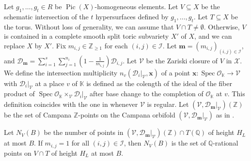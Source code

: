 \documentclass[10pt, a4paper, reqno, english]{amsart}
\newcommand\ZZ{\mathbb{Z}}
\newcommand\QQ{\mathbb{Q}}
\newcommand{\KK}{\mathbb{K}} %
\newcommand{\OO}{\mathcal{O}} %
\newcommand{\indexset}{{\mathcal I}} %
\DeclareMathOperator{\spec}{Spec} %
\DeclareMathOperator{\pic}{Pic} %
\theoremstyle{definition}
\numberwithin{theorem}{section}
\numberwithin{equation}{section}
\begin{document}
Let $g_1,\dots,g_t\in R$ be $\pic(X)$-homogeneous elements. 
Let $V\subseteq X$ be the schematic intersection of the $t$ hypersurfaces defined by $g_1,\dots,g_t$.
Let $T\subseteq X$ be the torus. Without loss of generality, we can assume that $V\cap T\neq\emptyset$. Otherwise, $V$ is contained in a complete smooth split toric subvariety $X'$ of $X$, and we can replace $X$ by $X'$.
Fix $m_{i,j}\in \ZZ_{\geq 1}$ for each $(i,j)\in\indexset$. 
Let $\mathbf m=(m_{i,j})_{(i,j)\in\indexset}$, and $\mathscr D_{\mathbf m}=\sum_{i=1}^s\sum_{j=1}^{n_i}\left(1-\frac 1{m_{i,j}}\right)\mathscr D_{i,j}$. 
Let $\mathscr V$ be the Zariski closure of $V$ in $\mathscr X$. 
We define the intersection multiplicity $n_v(\mathscr D_i|_{\mathscr V},\mathbf x)$ of a point $\mathbf x:\spec \OO_{\KK}\to\mathscr V$ with $\mathscr D_i|_{\mathscr V}$ at a place $v$ of $\KK$ is defined as the colength of the ideal of the fiber product of $\spec\OO_{\KK}\times_{\mathscr V}\mathscr D_i|_{\mathscr V}$ after base change to the completion of $\OO_{\KK}$ at $v$.
This definition coincides with the one in \cite[\S3]{PSTVA} whenever $\mathscr V$ is regular.
Let $\left(\mathscr V,\mathscr D_{\mathbf m}|_{\mathscr V}\right)(\ZZ)$ be the set of Campana $\ZZ$-points on the Campana orbifold  $\left(\mathscr V,\mathscr D_{\mathbf m}|_{\mathscr V}\right)$ as in \cite[Definition 3.4]{PSTVA}.

Let $N_V(B)$ be the number of points in $\left(\mathscr V,\mathscr D_{\mathbf m}|_{\mathscr V}\right)(\ZZ)\cap T(\QQ)$ of height $H_L$ at most $B$. If $m_{i,j}=1$ for all $(i,j)\in\indexset$, then $N_V(B)$ is the set of $\QQ$-rational points on $V\cap T$ of height $H_L$ at most $B$.
\end{document}

